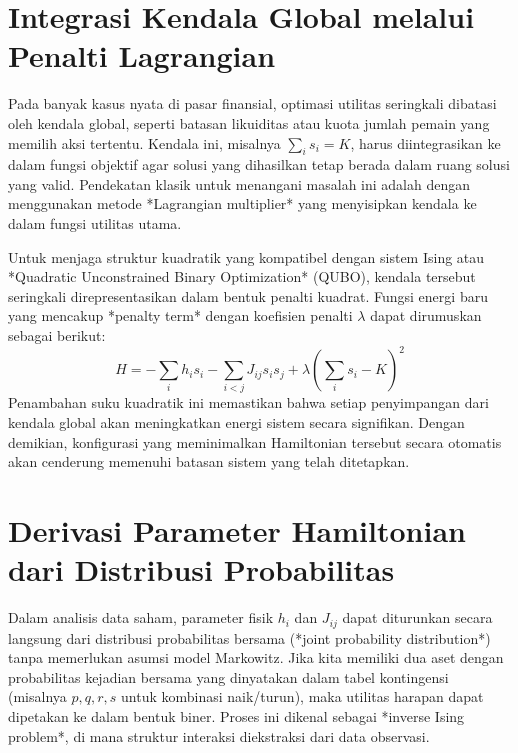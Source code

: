 \documentclass[12pt]{article}
\begin{document}
\section{Integrasi Kendala Global melalui Penalti Lagrangian}

Pada banyak kasus nyata di pasar finansial, optimasi utilitas seringkali dibatasi oleh kendala global, seperti batasan likuiditas atau kuota jumlah pemain yang memilih aksi tertentu. Kendala ini, misalnya $\sum_i s_i = K$, harus diintegrasikan ke dalam fungsi objektif agar solusi yang dihasilkan tetap berada dalam ruang solusi yang valid. Pendekatan klasik untuk menangani masalah ini adalah dengan menggunakan metode *Lagrangian multiplier* yang menyisipkan kendala ke dalam fungsi utilitas utama.

Untuk menjaga struktur kuadratik yang kompatibel dengan sistem Ising atau *Quadratic Unconstrained Binary Optimization* (QUBO), kendala tersebut seringkali direpresentasikan dalam bentuk penalti kuadrat. Fungsi energi baru yang mencakup *penalty term* dengan koefisien penalti $\lambda$ dapat dirumuskan sebagai berikut:
\begin{equation}
H = - \sum_i h_i s_i - \sum_{i<j} J_{ij} s_i s_j + \lambda \left( \sum_i s_i - K \right)^2 \tag{5}
\end{equation}
Penambahan suku kuadratik ini memastikan bahwa setiap penyimpangan dari kendala global akan meningkatkan energi sistem secara signifikan. Dengan demikian, konfigurasi yang meminimalkan Hamiltonian tersebut secara otomatis akan cenderung memenuhi batasan sistem yang telah ditetapkan.

\section{Derivasi Parameter Hamiltonian dari Distribusi Probabilitas}

Dalam analisis data saham, parameter fisik $h_i$ dan $J_{ij}$ dapat diturunkan secara langsung dari distribusi probabilitas bersama (*joint probability distribution*) tanpa memerlukan asumsi model Markowitz. Jika kita memiliki dua aset dengan probabilitas kejadian bersama yang dinyatakan dalam tabel kontingensi (misalnya $p, q, r, s$ untuk kombinasi naik/turun), maka utilitas harapan dapat dipetakan ke dalam bentuk biner. Proses ini dikenal sebagai *inverse Ising problem*, di mana struktur interaksi diekstraksi dari data observasi.
\end{document}
